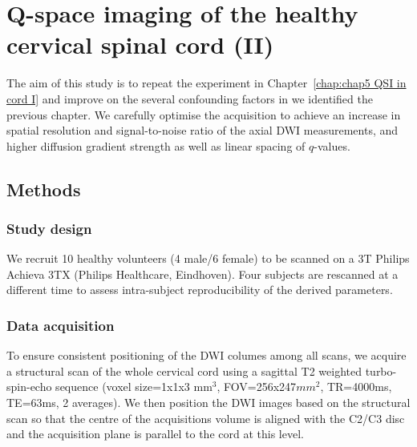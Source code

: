 \chapter[QSI of the healthy cord (II)]{Q-space imaging of the healthy cervical spinal cord (II)}
\label{chap:chap6 QSI in cord II}
The aim of this study is to repeat the experiment in Chapter~\ref{chap:chap5 QSI in cord I} and improve on the several confounding factors in we identified the previous chapter. We carefully optimise the acquisition to achieve an increase in spatial resolution and signal-to-noise ratio of the axial \gls{DWI} measurements, and higher diffusion gradient strength as well as linear spacing of $q$-values.

\section{Methods}
\subsection*{Study design}
We recruit 10 healthy volunteers (4 male/6 female) to be scanned on a 3T Philips Achieva 3TX (Philips Healthcare, Eindhoven). Four subjects are rescanned at a different time  to assess intra-subject reproducibility of the derived parameters.
\subsection*{Data acquisition}
To ensure consistent positioning of the \gls{DWI} columes among all scans, we acquire a structural scan of the whole cervical cord using a sagittal T2 weighted turbo-spin-echo sequence (voxel size=1x1x3 mm$^3$, FOV=256x247$mm^2$, TR=4000ms, TE=63ms, 2 averages). We then position the \gls{DWI} images based on the structural scan so that the centre of the acquisitions volume is aligned with the C2/C3 disc and the acquisition plane is parallel to the cord at this level.


